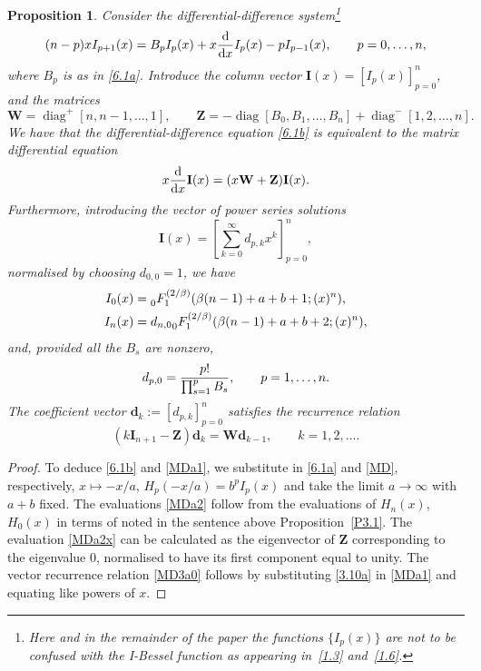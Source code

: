 \documentclass[pdftex]{sigma}
\numberwithin{equation}{section}
\newtheorem{Proposition}[Theorem]{Proposition}
\theoremstyle{definition}
\begin{document}
\begin{Proposition}\label{P3.2}
 Consider the
differential-difference system\footnote{Here and in the remainder of the paper the functions $\{I_p(x) \}$ are not to be confused with
the I-Bessel function as appearing in~\eqref{1.3} and~\eqref{1.6}.}
\begin{equation}\label{6.1b}
 (n - p) x I_{p+1}(x)
= B_p I_p(x) + x {{\rm d} \over {\rm d}x} I_p(x) - p I_{p-1}(x), \qquad p=0,\dots, n,
\end{equation}
where
$
B_p$ is as in \eqref{6.1a}. Introduce the column vector
${\mathbf I}(x) = [I_p(x)]_{p=0}^n$, and the matrices
\[%
{\mathbf W} = \operatorname{diag}^+ [n,n-1,\dots,1], \qquad
{\mathbf Z} = - \operatorname{diag} [B_0, B_1,\dots, B_n] + \operatorname{diag}^- [1, 2,\dots, n].
\]
We have that the differential-difference equation \eqref{6.1b} is equivalent to the matrix differential equation
\begin{equation}\label{MDa1}
x {{\rm d} \over {\rm d}x}\mathbf I(x) = (x\mathbf W +\mathbf Z) \mathbf I(x).
\end{equation}
Furthermore, introducing the vector of power series solutions
\begin{equation}\label{3.10a}
\mathbf I(x) = \left [ \sum_{k=0}^\infty d_{p,k} x^k \right ]_{p=0}^n,
\end{equation}
normalised by choosing $d_{0,0} =1$,
we have
\begin{align}
I_0(x) & = {\vphantom{F}}_0^{\mathstrut} F_1^{(2/\beta)} ( \beta (n - 1) + a + b + 1 ;(x)^n ),
\label{MDa22} \\
I_n(x) & = d_{n,0} {\vphantom{F}}_0^{\mathstrut} F_1^{(2/\beta)} ( \beta (n - 1) + a + b + 2 ;(x)^n )\label{MDa2},
\end{align}
and, provided all the $B_s$ are nonzero,
 \begin{equation}\label{MDa2x}
 d_{p,0} = {p! \over \prod_{s=1}^p B_s},
 \qquad p=1,\dots,n.
\end{equation}
 The coefficient vector $\mathbf d_k := [ d_{p,k} ]_{p=0}^n$ satisfies the recurrence relation
 \begin{equation}\label{MD3a0}
 (k {\mathbf I}_{n+1} -\mathbf Z) \mathbf d_k =\mathbf W \mathbf d_{k-1},\qquad k=1,2,\dots.
 \end{equation}
\end{Proposition}

\begin{proof}
To deduce \eqref{6.1b} and \eqref{MDa1}, we substitute in \eqref{6.1a} and \eqref{MD}, respectively, $x \mapsto -x/a$, $H_p(-x/a) = b^p I_p(x)$ and take the limit $a \to \infty$ with $a+b$ fixed.
The evaluations \eqref{MDa2} follow from the evaluations of $H_n(x)$,
$H_0(x)$ in terms of  noted in the sentence above Proposition~\ref{P3.1}.
The evaluation \eqref{MDa2x} can be calculated as the eigenvector of ${\mathbf Z}$ corresponding to the eigenvalue 0, normalised to have its first component equal to unity. The vector recurrence relation \eqref{MD3a0} follows by substituting \eqref{3.10a} in \eqref{MDa1} and equating like powers of $x$.
\end{proof}
\end{document}
